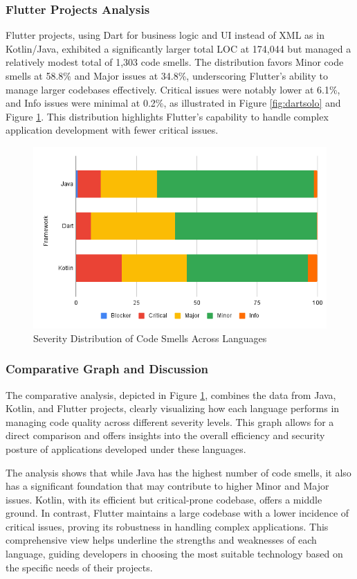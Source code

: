 \subsubsection{Flutter Projects Analysis}
Flutter projects, using Dart for business logic and UI instead of XML as in Kotlin/Java, exhibited a significantly larger total LOC at 174,044 but managed a relatively modest total of 1,303 code smells. The distribution favors Minor code smells at 58.8\% and Major issues at 34.8\%, underscoring Flutter's ability to manage larger codebases effectively. Critical issues were notably lower at 6.1\%, and Info issues were minimal at 0.2\%, as illustrated in Figure \ref{fig:dartsolo} and Figure \ref*{fig:totalsolo}. This distribution highlights Flutter's capability to handle complex application development with fewer critical issues.
 

\begin{figure}[htbp]
    \centering
    \includegraphics[scale = 0.58]{img/totalsolo.png}
    \caption{Severity Distribution of Code Smells Across Languages}
    \label{fig:totalsolo}
\end{figure}
\subsubsection{Comparative Graph and Discussion}
The comparative analysis, depicted in Figure \ref{fig:totalsolo}, combines the data from Java, Kotlin, and Flutter projects, clearly visualizing how each language performs in managing code quality across different severity levels. This graph allows for a direct comparison and offers insights into the overall efficiency and security posture of applications developed under these languages.
\par
The analysis shows that while Java has the highest number of code smells, it also has a significant foundation that may contribute to higher Minor and Major issues. Kotlin, with its efficient but critical-prone codebase, offers a middle ground. In contrast, Flutter maintains a large codebase with a lower incidence of critical issues, proving its robustness in handling complex applications. This comprehensive view helps underline the strengths and weaknesses of each language, guiding developers in choosing the most suitable technology based on the specific needs of their projects.
